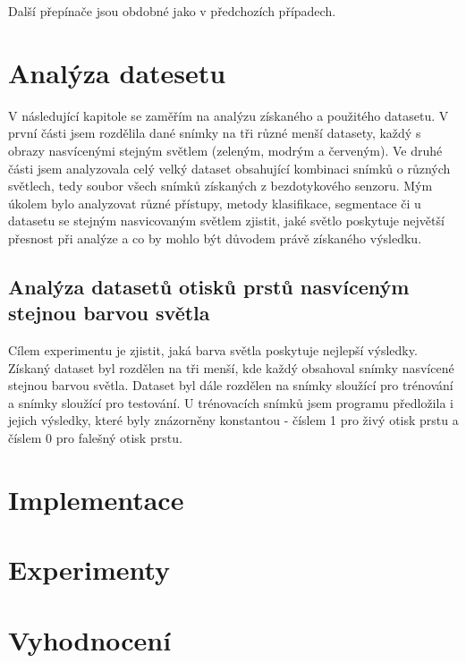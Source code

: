 Další přepínače jsou obdobné jako v předchozích případech.




\section{Analýza datesetu}
V následující kapitole se zaměřím na analýzu získaného a použitého datasetu. V první části jsem rozdělila dané snímky na tři různé menší datasety, každý s obrazy nasvícenými stejným světlem (zeleným, modrým a červeným). Ve druhé části jsem analyzovala celý velký dataset obsahující kombinaci snímků o různých světlech, tedy soubor všech snímků získaných z bezdotykového senzoru. Mým úkolem bylo analyzovat různé přístupy, metody klasifikace, segmentace či u datasetu se stejným nasvicovaným světlem zjistit, jaké světlo poskytuje největší přesnost při analýze a co by mohlo být důvodem právě získaného výsledku.

\subsection{Analýza datasetů otisků prstů nasvíceným stejnou barvou světla}
Cílem experimentu je zjistit, jaká barva světla poskytuje nejlepší výsledky. Získaný dataset byl rozdělen na tři menší, kde každý obsahoval snímky nasvícené stejnou barvou světla. Dataset byl dále rozdělen na snímky sloužící pro trénování a snímky sloužící pro testování. U trénovacích snímků jsem programu předložila i jejich výsledky, které byly znázorněny konstantou - číslem 1 pro živý otisk prstu a číslem 0 pro falešný otisk prstu. 

\section{Implementace}

\section{Experimenty}

\section{Vyhodnocení}






\label{citace}



